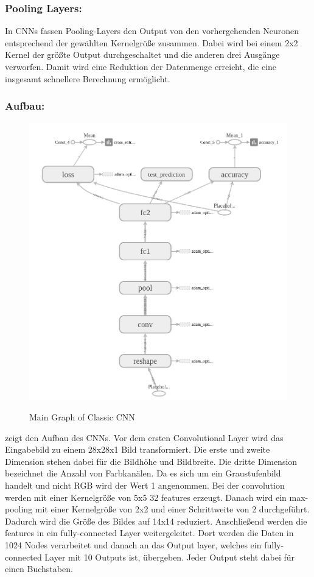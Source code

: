 \documentclass[runningheads,a4paper]{llncs}[2015/06/24]
\begin{document}
\subsubsection*{Pooling Layers:}
In CNNs fassen Pooling-Layers den Output von den vorhergehenden Neuronen entsprechend der gewählten Kernelgröße zusammen. Dabei wird bei einem 2x2 Kernel der größte Output durchgeschaltet und die anderen drei Ausgänge verworfen. Damit wird eine Reduktion der Datenmenge erreicht, die eine insgesamt schnellere Berechnung ermöglicht.

\subsubsection*{Aufbau:}
\begin{figure}
	\caption{Main Graph of Classic CNN}
	\includegraphics[width=\textwidth]{images/main_graph_conv.png}
	\label{fig:main_graph}
\end{figure}
 zeigt den Aufbau des CNNs. Vor dem ersten Convolutional Layer wird das Eingabebild zu einem 28x28x1 Bild transformiert. Die erste und zweite Dimension stehen dabei für die Bildhöhe und Bildbreite. Die dritte Dimension bezeichnet die Anzahl von Farbkanälen. Da es sich um ein Graustufenbild handelt und nicht RGB wird der Wert 1 angenommen. 
Bei der convolution werden mit einer Kernelgröße von 5x5 32 features erzeugt. Danach wird ein max-pooling mit einer Kernelgröße von 2x2 und einer Schrittweite von 2 durchgeführt. Dadurch wird die Größe des Bildes auf 14x14 reduziert. Anschließend werden die features in ein fully-connected Layer weitergeleitet. Dort werden die Daten in 1024 Nodes verarbeitet und danach an das Output layer, welches ein fully-connected Layer mit 10 Outputs ist, übergeben. Jeder Output steht dabei für einen Buchstaben.
\end{document}
